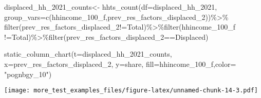 \documentclass[
]{article}
\newenvironment{Shaded}{\begin{snugshade}}{\end{snugshade}}
\newcommand{\AttributeTok}[1]{\textcolor[rgb]{0.77,0.63,0.00}{#1}}
\newcommand{\FunctionTok}[1]{\textcolor[rgb]{0.00,0.00,0.00}{#1}}
\newcommand{\NormalTok}[1]{#1}
\newcommand{\OtherTok}[1]{\textcolor[rgb]{0.56,0.35,0.01}{#1}}
\newcommand{\SpecialCharTok}[1]{\textcolor[rgb]{0.00,0.00,0.00}{#1}}
\newcommand{\StringTok}[1]{\textcolor[rgb]{0.31,0.60,0.02}{#1}}
\begin{document}
\begin{Shaded}
\begin{Highlighting}[]
\NormalTok{displaced\_hh\_2021\_counts}\OtherTok{\textless{}{-}} \FunctionTok{hhts\_count}\NormalTok{(}\AttributeTok{df=}\NormalTok{displaced\_hh\_2021, }\AttributeTok{group\_vars=}\FunctionTok{c}\NormalTok{(}\StringTok{\textquotesingle{}hhincome\_100\_f\textquotesingle{}}\NormalTok{,}\StringTok{\textquotesingle{}prev\_res\_factors\_displaced\_2\textquotesingle{}}\NormalTok{))}\SpecialCharTok{\%\textgreater{}\%}
\FunctionTok{filter}\NormalTok{(prev\_res\_factors\_displaced\_2}\SpecialCharTok{!=}\StringTok{\textquotesingle{}Total\textquotesingle{}}\NormalTok{)}\SpecialCharTok{\%\textgreater{}\%}\FunctionTok{filter}\NormalTok{(hhincome\_100\_f }\SpecialCharTok{!=}\StringTok{\textquotesingle{}Total\textquotesingle{}}\NormalTok{)}\SpecialCharTok{\%\textgreater{}\%}\FunctionTok{filter}\NormalTok{(prev\_res\_factors\_displaced\_2}\SpecialCharTok{==}\StringTok{\textquotesingle{}Displaced\textquotesingle{}}\NormalTok{)}

\FunctionTok{static\_column\_chart}\NormalTok{(}\AttributeTok{t=}\NormalTok{displaced\_hh\_2021\_counts, }\AttributeTok{x=}\StringTok{\textquotesingle{}prev\_res\_factors\_displaced\_2\textquotesingle{}}\NormalTok{, }\AttributeTok{y=}\StringTok{\textquotesingle{}share\textquotesingle{}}\NormalTok{, }\AttributeTok{fill=}\StringTok{\textquotesingle{}hhincome\_100\_f\textquotesingle{}}\NormalTok{,}\AttributeTok{color=}  \StringTok{"pognbgy\_10"}\NormalTok{)}
\end{Highlighting}
\end{Shaded}

\texttt{[image: more\_test\_examples\_files/figure-latex/unnamed-chunk-14-3.pdf]}
\end{document}
